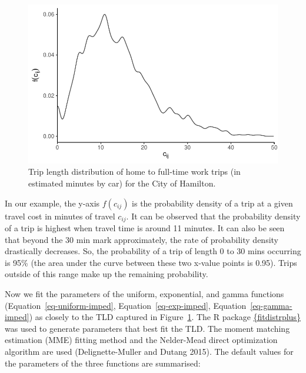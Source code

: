 \documentclass[12pt, oneside]{report}
\begin{document}
\begin{figure}

{\centering \includegraphics{tools-report_files/figure-pdf/fig-TLD-empirical-1.pdf}

}

\caption{\label{fig-TLD-empirical}Trip length distribution of home to
full-time work trips (in estimated minutes by car) for the City of
Hamilton.}

\end{figure}

In our example, the y-axis \(f(c_{ij})\) is the probability density of a
trip at a given travel cost in minutes of travel \(c_{ij}\). It can be
observed that the probability density of a trip is highest when travel
time is around 11 minutes. It can also be seen that beyond the 30 min
mark approximately, the rate of probability density drastically
decreases. So, the probability of a trip of length 0 to 30 mins
occurring is 95\% (the area under the curve between these two x-value
points is 0.95). Trips outside of this range make up the remaining
probability.

Now we fit the parameters of the uniform, exponential, and gamma
functions (Equation~\ref{eq-uniform-imped}, Equation~\ref{eq-exp-imped},
Equation~\ref{eq-gamma-imped}) as closely to the TLD captured in
Figure~\ref{fig-TLD-empirical}. The R package
\href{https://cloud.r-project.org/web/packages/fitdistrplus/index.html}{\{fitdistrplus\}}
was used to generate parameters that best fit the TLD. The moment
matching estimation (MME) fitting method and the Nelder-Mead direct
optimization algorithm are used (Delignette-Muller and Dutang 2015). The
default values for the parameters of the three functions are summarised:
\end{document}
